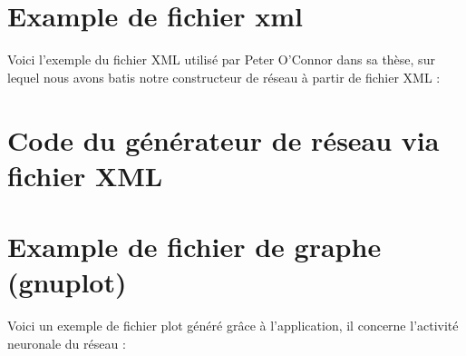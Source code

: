 \documentclass[a4paper,10pt]{article}
\begin{document}
\section{Example de fichier xml}
\label{xml_exemple}

Voici l'exemple du fichier XML utilisé par Peter O'Connor dans sa thèse, sur lequel nous avons batis notre constructeur de réseau à partir de fichier XML :
 


\section{Code du générateur de réseau via fichier XML}
\label{xml_builder}



\section{Example de fichier de graphe (gnuplot)}

Voici un exemple de fichier plot généré grâce à l'application, il concerne l'activité neuronale du réseau : 


\end{document}
